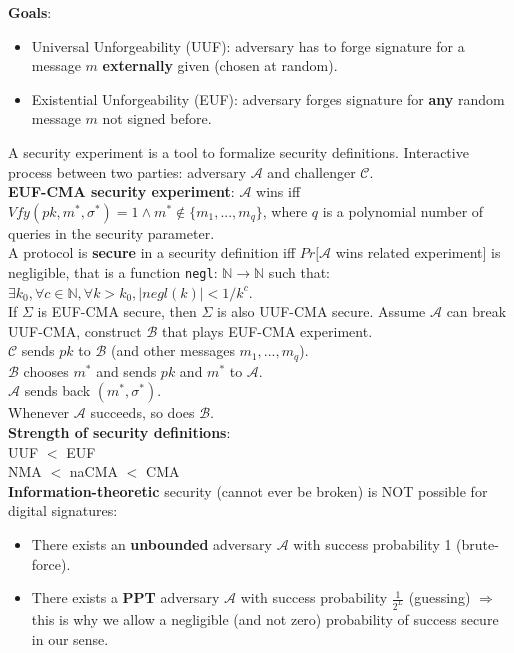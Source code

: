 \documentclass[oneside]{book}
\newcommand{\N}[0]{\mathbb{N}}
\newcommand{\cA}[0]{\mathcal{A}}
\newcommand{\cB}[0]{\mathcal{B}}
\begin{document}
\textbf{Goals}:
\begin{itemize}
    \item Universal Unforgeability (UUF): adversary has to forge signature for a message $m$ \textbf{externally} given (chosen at random).
    \item Existential Unforgeability (EUF): adversary forges signature for \textbf{any} random message $m$ not signed before.
\end{itemize}

A security experiment is a tool to formalize security definitions.
Interactive process between two parties: adversary $\mathcal{A}$ and challenger $\mathcal{C}$.\\

\textbf{EUF-CMA security experiment}: $\mathcal{A}$ wins iff $Vfy(pk, m^*, \sigma^*) = 1 \land m^* \notin \{m_1, ..., m_q\}$, where $q$ is a polynomial number of queries in the security parameter.\\

A protocol is \textbf{secure} in a security definition iff $Pr[\mathcal{A}$ wins related experiment$]$ is negligible, that is a function \texttt{negl}: $\N \rightarrow \N$ such that:
$\exists k_0, \forall c \in \N, \forall k > k_0, |negl(k)| < 1/k^c$.\\


If $\Sigma$ is EUF-CMA secure, then $\Sigma$ is also UUF-CMA secure.
Assume $\mathcal{A}$ can break UUF-CMA, construct $\mathcal{B}$ that plays EUF-CMA experiment.\\
$\mathcal{C}$ sends $pk$ to $\mathcal{B}$ (and other messages $m_1, ..., m_q$).\\ $\mathcal{B}$ chooses $m^*$ and sends $pk$ and $m^*$ to $\mathcal{A}$.\\
$\cA$ sends back $(m^*, \sigma^*)$.\\
Whenever $\cA$ succeeds, so does $\cB$.\\

\textbf{Strength of security definitions}:\\
UUF $<$ EUF\\
NMA $<$ naCMA $<$ CMA\\

\textbf{Information-theoretic} security (cannot ever be broken) is NOT possible for digital signatures:
\begin{itemize}
    \item There exists an \textbf{unbounded} adversary $\cA$ with success probability 1 (brute-force).
    \item There exists a \textbf{PPT} adversary $\cA$ with success probability $\frac{1}{2^L}$ (guessing) $\Rightarrow$ this is why we allow a negligible (and not zero) probability of success secure in our sense.
\end{itemize}
\end{document}
